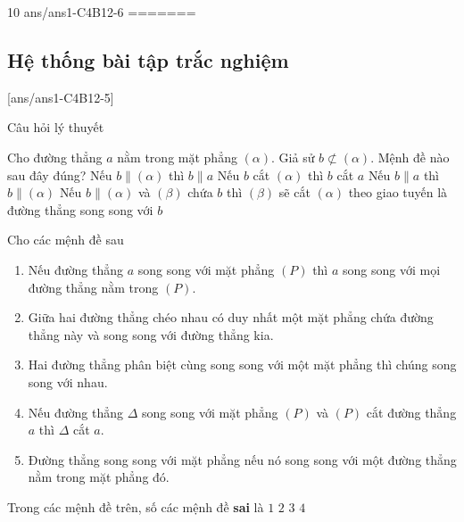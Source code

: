 \begin{indapan}{10}
	{ans/ans1-C4B12-6}
=======
\subsection{Hệ thống bài tập trắc nghiệm}
[ans/ans1-C4B12-5]
\begin{dang}{Câu hỏi lý thuyết}
\end{dang}
	\begin{ex}%
		Cho đường thẳng $a$ nằm trong mặt phẳng $(\alpha)$. Giả sử $b \not\subset (\alpha)$. Mệnh đề nào sau đây đúng?
		\choice
		{Nếu $b \parallel (\alpha)$ thì $b \parallel a$}
		{Nếu $b$ cắt $(\alpha)$ thì $b$ cắt $a$}
		{\True Nếu $b \parallel a$ thì $b \parallel (\alpha)$}
		{Nếu $b \parallel (\alpha)$ và $(\beta)$ chứa $b$ thì $(\beta)$ sẽ cắt $(\alpha)$ theo giao tuyến là đường thẳng song song với $b$}
	\end{ex}
	\begin{ex}%
		Cho các mệnh đề sau
		\begin{enumerate}[1.]
			\item Nếu đường thẳng $a$ song song với mặt phẳng $(P)$ thì $a$ song song với mọi đường thẳng nằm trong $(P)$.
			\item Giữa hai đường thẳng chéo nhau có duy nhất một mặt phẳng chứa đường thẳng này và song song với đường thẳng kia.
			\item Hai đường thẳng phân biệt cùng song song với một mặt phẳng thì chúng song song với nhau.
			\item Nếu đường thẳng $\Delta$ song song với mặt phẳng $(P)$ và $(P)$ cắt đường thẳng $a$ thì $\Delta$ cắt $a$.
			\item Đường thẳng song song với mặt phẳng nếu nó song song với một đường thẳng nằm trong mặt phẳng đó.
		\end{enumerate}
		Trong các mệnh đề trên, số các mệnh đề \textbf{sai} là
		\choice
		{$1$}
		{$2$}
		{$3$}
		{\True $4$}
	\end{ex}


\end{indapan}
